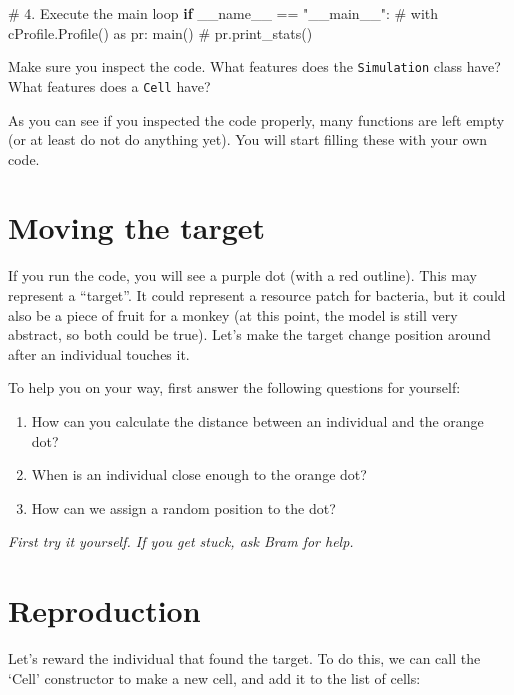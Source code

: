 \documentclass[
  letterpaper,
  DIV=11,
  numbers=noendperiod]{scrreprt}
\newenvironment{Shaded}{\begin{snugshade}}{\end{snugshade}}
\newcommand{\CommentTok}[1]{\textcolor[rgb]{0.37,0.37,0.37}{#1}}
\newcommand{\ControlFlowTok}[1]{\textcolor[rgb]{0.00,0.23,0.31}{\textbf{#1}}}
\newcommand{\NormalTok}[1]{\textcolor[rgb]{0.00,0.23,0.31}{#1}}
\newcommand{\OperatorTok}[1]{\textcolor[rgb]{0.37,0.37,0.37}{#1}}
\newcommand{\StringTok}[1]{\textcolor[rgb]{0.13,0.47,0.30}{#1}}
\newcommand{\VariableTok}[1]{\textcolor[rgb]{0.07,0.07,0.07}{#1}}
\providecommand{\tightlist}{%
  \setlength{\itemsep}{0pt}\setlength{\parskip}{0pt}}\usepackage{longtable,booktabs,array}
\theoremstyle{definition}
\theoremstyle{remark}
\begin{document}
\begin{tcolorbox}
\begin{Shaded}
\begin{Highlighting}[]
            
\CommentTok{\# 4. Execute the main loop}
\ControlFlowTok{if} \VariableTok{\_\_name\_\_} \OperatorTok{==} \StringTok{"\_\_main\_\_"}\NormalTok{:}
    \CommentTok{\# with cProfile.Profile() as pr:}
\NormalTok{        main()}
        \CommentTok{\# pr.print\_stats()}


\end{Highlighting}
\end{Shaded}

\end{tcolorbox}

Make sure you inspect the code. What features does the
\texttt{Simulation} class have? What features does a \texttt{Cell} have?

As you can see if you inspected the code properly, many functions are
left empty (or at least do not do anything yet). You will start filling
these with your own code.

\section{Moving the target}\label{sec-movingtarget}

If you run the code, you will see a purple dot (with a red outline).
This may represent a ``target''. It could represent a resource patch for
bacteria, but it could also be a piece of fruit for a monkey (at this
point, the model is still very abstract, so both could be true). Let's
make the target change position around after an individual touches it.

To help you on your way, first answer the following questions for
yourself:

\begin{enumerate}
\def\labelenumi{\alph{enumi}.}
\tightlist
\item
  How can you calculate the distance between an individual and the
  orange dot?
\item
  When is an individual close enough to the orange dot?
\item
  How can we assign a random position to the dot?
\end{enumerate}

\emph{First try it yourself. If you get stuck, ask Bram for help.}

\section{Reproduction}\label{sec-reproduction}

Let's reward the individual that found the target. To do this, we can
call the `Cell' constructor to make a new cell, and add it to the list
of cells:
\end{document}
